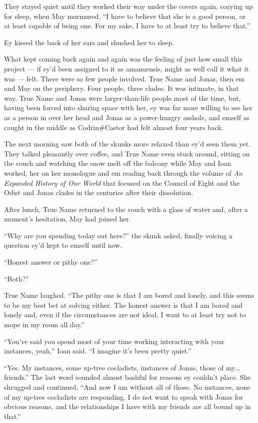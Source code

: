They stayed quiet until they worked their way under the covers again, cozying up for sleep, when May murmured, ``I have to believe that she is a good person, or at least capable of being one. For my sake, I have to at least try to believe that.''

Ey kissed the back of her ears and shushed her to sleep.

What kept coming back again and again was the feeling of just how small this project — if ey'd been assigned to it as amanuensis, might as well call it what it was — felt. There were so few people involved. True Name and Jonas, then em and May on the periphery. Four people, three clades. It was intimate, in that way. True Name and Jonas were larger-than-life people most of the time, but, having been forced into sharing space with her, ey was far more willing to see her as a person in over her head and Jonas as a power-hungry asshole, and emself as caught in the middle as Codrin\#Castor had felt almost four years back.

The next morning saw both of the skunks more relaxed than ey'd seen them yet. They talked pleasantly over coffee, and True Name even stuck around, sitting on the couch and watching the snow melt off the balcony while May and Ioan worked, her on her monologue and em reading back through the volume of \emph{An Expanded History of Our World} that focused on the Council of Eight and the Odist and Jonas clades in the centuries after their dissolution.

After lunch, True Name returned to the couch with a glass of water and, after a moment's hesitation, May had joined her.

``Why are you spending today out here?'' the skunk asked, finally voicing a question ey'd kept to emself until now.

``Honest answer or pithy one?''

``Both?''

True Name laughed. ``The pithy one is that I am bored and lonely, and this seems to be my best bet at solving either. The honest answer is that I am bored and lonely and, even if the circumstances are not ideal, I want to at least try not to mope in my room all day.''

``You've said you spend most of your time working interacting with your instances, yeah,'' Ioan said. ``I imagine it's been pretty quiet.''

``Yes. My instances, some up-tree cocladists, instances of Jonas, those of my\ldots friends.'' The last word sounded almost bashful for reasons ey couldn't place. She shrugged and continued, ``And now I am without all of those. No instances, none of my up-tree cocladists are responding, I do not want to speak with Jonas for obvious reasons, and the relationships I have with my friends are all bound up in that.''

